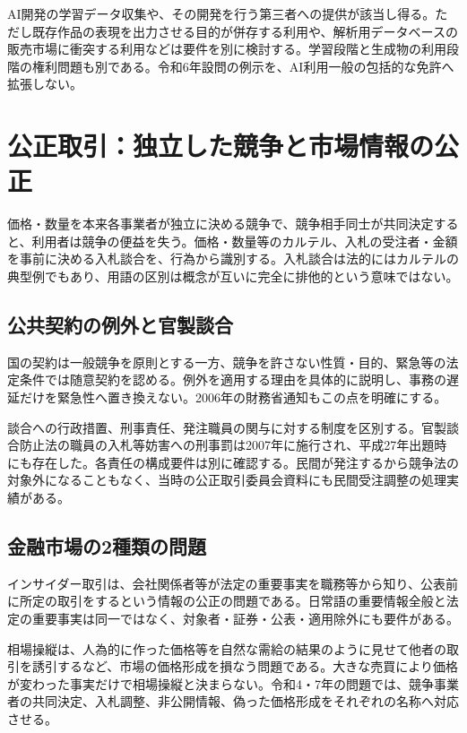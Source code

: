 AI開発の学習データ収集や、その開発を行う第三者への提供が該当し得る。ただし既存作品の表現を出力させる目的が併存する利用や、解析用データベースの販売市場に衝突する利用などは要件を別に検討する。学習段階と生成物の利用段階の権利問題も別である\parencite{bunka_ai2024,bunka_text2026}。令和6年設問の例示を、AI利用一般の包括的な免許へ拡張しない。

\section{公正取引：独立した競争と市場情報の公正}
\label{theory:compliance:competition}
価格・数量を本来各事業者が独立に決める競争で、競争相手同士が共同決定すると、利用者は競争の便益を失う。価格・数量等のカルテル、入札の受注者・金額を事前に決める入札談合を、行為から識別する\parencite{jftc_rules}。入札談合は法的にはカルテルの典型例でもあり、用語の区別は概念が互いに完全に排他的という意味ではない\parencite{jftc_bid_cartel2021}。

\subsection{公共契約の例外と官製談合}
\label{theory:compliance:procurement}
国の契約は一般競争を原則とする一方、競争を許さない性質・目的、緊急等の法定条件では随意契約を認める。例外を適用する理由を具体的に説明し、事務の遅延だけを緊急性へ置き換えない。2006年の財務省通知もこの点を明確にする\parencite{mof_procurement2006}。

談合への行政措置、刑事責任、発注職員の関与に対する制度を区別する。官製談合防止法の職員の入札等妨害への刑事罰は2007年に施行され、平成27年出題時にも存在した\parencite{jftc_kansei}。各責任の構成要件は別に確認する。民間が発注するから競争法の対象外になることもなく、当時の公正取引委員会資料にも民間受注調整の処理実績がある\parencite{jftc_private2018}。

\subsection{金融市場の2種類の問題}
\label{theory:compliance:market}
インサイダー取引は、会社関係者等が法定の重要事実を職務等から知り、公表前に所定の取引をするという情報の公正の問題である。日常語の重要情報全般と法定の重要事実は同一ではなく、対象者・証券・公表・適用除外にも要件がある\parencite{fsa_insider_rules}。

相場操縦は、人為的に作った価格等を自然な需給の結果のように見せて他者の取引を誘引するなど、市場の価格形成を損なう問題である。大きな売買により価格が変わった事実だけで相場操縦と決まらない\parencite{fsa_market2004}。令和4・7年の問題では、競争事業者の共同決定、入札調整、非公開情報、偽った価格形成をそれぞれの名称へ対応させる。

